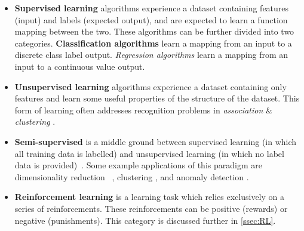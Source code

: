 \begin{itemize}

    \item \textbf{Supervised learning} algorithms experience a dataset
    containing features (input) and labels (expected output), and are
    expected to learn a function mapping between the two. These algorithms
    can be further divided into two categories. \textbf{Classification algorithms}
    learn a mapping from an input to a discrete class label output. \textit{Regression
    algorithms} learn a mapping from an input to a continuous value output.


    \item \textbf{Unsupervised learning} algorithms experience a dataset
    containing only features and learn some useful properties of the structure
    of the dataset. This form of learning often addresses recognition problems
    in \textit{association} \& \textit{clustering} \cite{barlow1999ul}.

    \item \textbf{Semi-supervised} is a middle ground between supervised
    learning (in which all training data is labelled) and unsupervised learning
    (in which no label data is provided)~\cite{books/mit/06/CSZ2006}. Some
    example applications of this paradigm are dimensionality reduction
    ~\cite{Zhang2007}, clustering \cite{Bair2013}, and anomaly detection
    \cite{DBLP:journals/corr/abs-1805-06725}.

    \item \textbf{Reinforcement learning} is a learning task which relies
    exclusively on a series of reinforcements. These reinforcements can be
    positive (rewards) or negative (punishments). This category is discussed
    further in \autoref{ssec:RL}.
\end{itemize}

